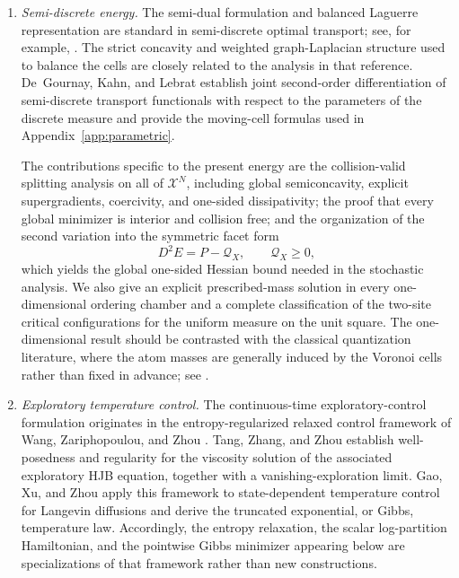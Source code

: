 \documentclass[11pt]{article}
\def\Xc{{\mathcal X}}
\theoremstyle{definition}
\theoremstyle{remark}
\numberwithin{equation}{section}
\begin{document}
\begin{enumerate}[label=\textup{(\roman*)},leftmargin=2.8em]

\item \emph{Semi-discrete energy.}
The semi-dual formulation and balanced Laguerre representation are standard in semi-discrete
optimal transport; see, for example, \cite{Villani2009,KitagawaMerigotThibert2019}.  The strict concavity and weighted graph-Laplacian structure used to balance the cells are
closely related to the analysis in that reference.  De~Gournay, Kahn, and Lebrat
\cite{deGournayKahnLebrat2019} establish joint second-order differentiation of semi-discrete
transport functionals with respect to the parameters of the discrete measure and provide the
moving-cell formulas used in Appendix~\ref{app:parametric}.

The contributions specific to the present energy are the collision-valid splitting analysis on all of
$\Xc^N$, including global semiconcavity, explicit supergradients, coercivity, and one-sided
dissipativity; the proof that every global minimizer is interior and collision free; and the
organization of the second variation into the symmetric facet form
\[
 D^2E=P-\mathcal Q_X,
 \qquad \mathcal Q_X\ge0,
\]
which yields the global one-sided Hessian bound needed in the stochastic analysis.  We also give an
explicit prescribed-mass solution in every one-dimensional ordering chamber and a complete
classification of the two-site critical configurations for the uniform measure on the unit square.
The one-dimensional result should be contrasted with the classical quantization literature, where
the atom masses are generally induced by the Voronoi cells rather than fixed in advance; see
\cite{GrafLuschgy2000}.

\item \emph{Exploratory temperature control.}
The continuous-time exploratory-control formulation originates in the entropy-regularized relaxed
control framework of Wang, Zariphopoulou, and Zhou
\cite{WangZariphopoulouZhou2020}.  Tang, Zhang, and Zhou
\cite{TangZhangZhou2022} establish well-posedness and regularity for the viscosity solution of the
associated exploratory HJB equation, together with a vanishing-exploration limit.  Gao, Xu, and Zhou
\cite{GaoXuZhou2022} apply this framework to state-dependent temperature control for Langevin
diffusions and derive the truncated exponential, or Gibbs, temperature law.  Accordingly, the
entropy relaxation, the scalar log-partition Hamiltonian, and the pointwise Gibbs minimizer appearing
below are specializations of that framework rather than new constructions.


\end{enumerate}
\end{document}
